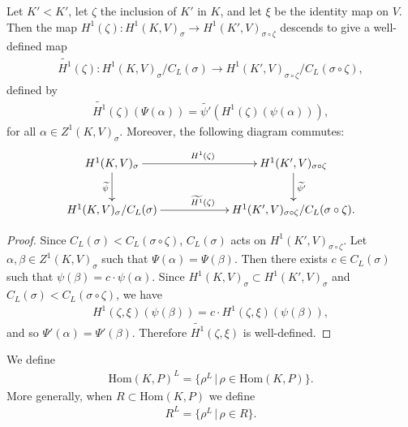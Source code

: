 \begin{lemma} Let $K' < K'$, let $\zeta$ the inclusion of $K'$ in $K$, and let $\xi$ be the identity map on $V$. Then the map $H^1(\zeta):H^1(K, V)_\sigma \rightarrow H^1(K', V)_{\sigma\circ\zeta}$ descends to give a well-defined map
	\begin{align*}
		\widetilde{H^1}(\zeta): H^1(K, V)_\sigma/C_L(\sigma) \rightarrow H^1(K', V)_{\sigma\circ\zeta}/C_L(\sigma\circ \zeta),
	\end{align*}
defined by
	\begin{align*}
		\widetilde{H^1}(\zeta)(\Psi(\alpha)) = \widetilde{\psi'}\left(H^1(\zeta)(\psi(\alpha))\right),
	\end{align*}
for all $\alpha\in Z^1(K, V)_\sigma$.
Moreover, the following diagram commutes:
  \begin{align*}
    \xymatrix@C=60pt{
		H^1(K, V)_\sigma \ar[r]^{H^1(\zeta)} \ar[d]_{\widetilde{\psi}} & H^1(K', V)_{\sigma\circ\zeta} \ar[d]^{\widetilde{\psi'}} \\
		H^1(K, V)_\sigma/C_L(\sigma) \ar[r]^{\widetilde{H^1}(\zeta)} & {H^1(K', V)_{\sigma\circ\zeta}/C_L(\sigma\circ\zeta)}.
    }
  \end{align*}
\end{lemma}
\begin{proof}
Since $C_L(\sigma) < C_L(\sigma\circ\zeta)$, $C_L(\sigma)$ acts on $H^1(K', V)_{\sigma\circ\zeta}$. 
	Let $\alpha, \beta \in Z^1(K, V)_\sigma$ such that $\Psi(\alpha) = \Psi(\beta)$. Then there exists $c \in C_L(\sigma)$ such that $\psi(\beta) = c \cdot \psi(\alpha)$. Since $H^1(K, V)_\sigma \subset H^1(K', V)_\sigma$ and $C_L(\sigma) < C_L(\sigma\circ\zeta)$, we have
	\begin{align*}
		H^1(\zeta, \xi)\left(\psi(\beta)\right) = c \cdot H^1(\zeta, \xi)\left(\psi(\beta)\right),
	\end{align*}
	and so $\Psi'(\alpha) = \Psi'(\beta)$. Therefore $\widetilde{H^1}(\zeta, \xi)$ is well-defined.
\end{proof}

\begin{definition} We define
	\begin{align*}
		\mathrm{Hom}(K, P)^L = \{\rho^L\,|\,\rho \in \mathrm{Hom}(K, P)\}.
	\end{align*}
	More generally, when $R \subset \mathrm{Hom}(K, P)$ we define
	\begin{align*}
		R^L = \{\rho^L\,|\,\rho \in R\}.
	\end{align*}
\end{definition}

